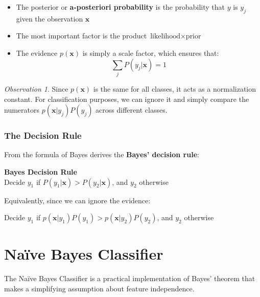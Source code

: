 \documentclass[11pt,a4paper]{article}
\theoremstyle{definition}
\theoremstyle{plain}
\theoremstyle{remark}
\newtheorem*{observation}{Observation}
\begin{document}
\begin{itemize}
    \item The posterior or \textbf{a-posteriori probability} is the probability that $y$ is $y_j$ given the observation $\mathbf{x}$
    
    \item The most important factor is the product $\text{likelihood} \times \text{prior}$
    
    \item The evidence $p(\mathbf{x})$ is simply a scale factor, which ensures that:
    \[
    \sum_{j} P(y_j|\mathbf{x}) = 1
    \]
\end{itemize}

\begin{observation}
Since $p(\mathbf{x})$ is the same for all classes, it acts as a normalization constant. For classification purposes, we can ignore it and simply compare the numerators $p(\mathbf{x}|y_j)P(y_j)$ across different classes.
\end{observation}

\subsubsection{The Decision Rule}

From the formula of Bayes derives the \textbf{Bayes' decision rule}:

\begin{center}
\colorbox{orange!20}{\parbox{0.85\textwidth}{
\centering
\textbf{Bayes Decision Rule}\\[0.2cm]
Decide $y_1$ if $P(y_1|\mathbf{x}) > P(y_2|\mathbf{x})$, and $y_2$ otherwise
}}
\end{center}

Equivalently, since we can ignore the evidence:

\begin{center}
\colorbox{cyan!20}{\parbox{0.85\textwidth}{
\centering
Decide $y_1$ if $p(\mathbf{x}|y_1)P(y_1) > p(\mathbf{x}|y_2)P(y_2)$, and $y_2$ otherwise
}}
\end{center}

\section{Naïve Bayes Classifier}

The Naïve Bayes Classifier is a practical implementation of Bayes' theorem that makes a simplifying assumption about feature independence.
\end{document}
